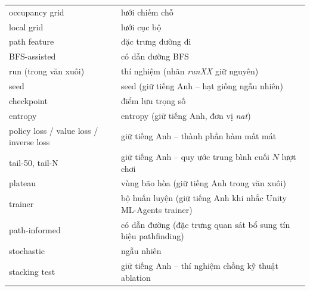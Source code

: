\begin{tabular}{p{5cm} p{9cm}}
occupancy grid & lưới chiếm chỗ \\
local grid & lưới cục bộ \\
path feature & đặc trưng đường đi \\
BFS-assisted & có dẫn đường BFS \\
run (trong văn xuôi) & thí nghiệm (nhãn \textit{runXX} giữ nguyên) \\
seed & seed (giữ tiếng Anh -- hạt giống ngẫu nhiên) \\
checkpoint & điểm lưu trọng số \\
entropy & entropy (giữ tiếng Anh, đơn vị \textit{nat}) \\
policy loss / value loss / inverse loss & giữ tiếng Anh -- thành phần hàm mất mát \\
tail-50, tail-N & giữ tiếng Anh -- quy ước trung bình cuối $N$ lượt chơi \\
plateau & vùng bão hòa (giữ tiếng Anh trong văn xuôi) \\
trainer & bộ huấn luyện (giữ tiếng Anh khi nhắc Unity ML-Agents trainer) \\
path-informed & có dẫn đường (đặc trưng quan sát bổ sung tín hiệu pathfinding) \\
stochastic & ngẫu nhiên \\
stacking test & giữ tiếng Anh -- thí nghiệm chồng kỹ thuật ablation \\
\end{tabular}
